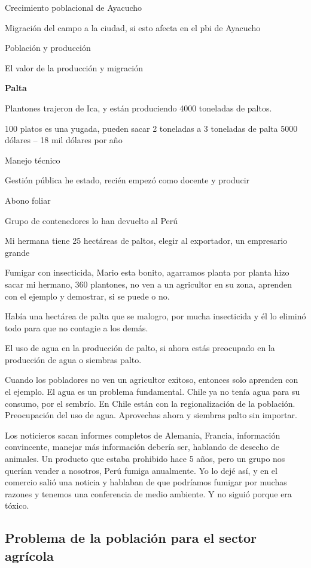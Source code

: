 \documentclass[
  a4paper,
]{article}
\begin{document}
Crecimiento poblacional de Ayacucho

Migración del campo a la ciudad, si esto afecta en el pbi de Ayacucho

Población y producción

El valor de la producción y migración

\textbf{Palta}

Plantones trajeron de Ica, y están produciendo 4000 toneladas de paltos.

100 platos es una yugada, pueden sacar 2 toneladas a 3 toneladas de
palta 5000 dólares -- 18 mil dólares por año

Manejo técnico

Gestión pública he estado, recién empezó como docente y producir

Abono foliar

Grupo de contenedores lo han devuelto al Perú

Mi hermana tiene 25 hectáreas de paltos, elegir al exportador, un
empresario grande

Fumigar con insecticida, Mario esta bonito, agarramos planta por planta
hizo sacar mi hermano, 360 plantones, no ven a un agricultor en su zona,
aprenden con el ejemplo y demostrar, si se puede o no.

Había una hectárea de palta que se malogro, por mucha insecticida y él
lo eliminó todo para que no contagie a los demás.

El uso de agua en la producción de palto, si ahora estás preocupado en
la producción de agua o siembras palto.

Cuando los pobladores no ven un agricultor exitoso, entonces solo
aprenden con el ejemplo. El agua es un problema fundamental. Chile ya no
tenía agua para su consumo, por el sembrío. En Chile están con la
regionalización de la población. Preocupación del uso de agua.
Aprovechas ahora y siembras palto sin importar.

Los noticieros sacan informes completos de Alemania, Francia,
información convincente, manejar más información debería ser, hablando
de desecho de animales. Un producto que estaba prohibido hace 5 años,
pero un grupo nos querían vender a nosotros, Perú fumiga anualmente. Yo
lo dejé así, y en el comercio salió una noticia y hablaban de que
podríamos fumigar por muchas razones y tenemos una conferencia de medio
ambiente. Y no siguió porque era tóxico.

\hypertarget{problema-de-la-poblaciuxf3n-para-el-sector-agruxedcola}{%
\subsection{Problema de la población para el sector
agrícola}\label{problema-de-la-poblaciuxf3n-para-el-sector-agruxedcola}}
\end{document}
